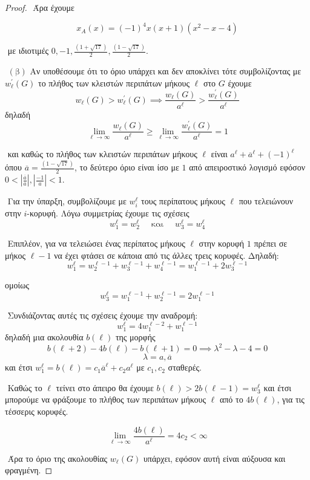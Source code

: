 \documentclass[oneside,a4paper]{article}
\begin{document}
\begin{proof}
	$ $\newline
	Άρα έχουμε
	
	$$x_A (x) = (-1)^4 x(x+1)(x^2-x-4)$$
	
	$ $\newline
	με ιδιοτιμές $0,-1,\frac{(1+\sqrt{17})}2, \frac{(1-\sqrt{17})}2$.

	$ $\newline
	$(\text{β})$ Αν υποθέσουμε ότι το όριο υπάρχει και δεν αποκλίνει τότε συμβολίζοντας με $w^{\prime}_{\ell}(G)$ το πλήθος των κλειστών περιπάτων μήκους $\ell$ στο $G$ έχουμε
	$$w_{\ell}(G) > w^{\prime}_{\ell}(G) \implies \frac{w_{\ell}(G)}{a^{\ell}} > \frac{w^{\prime}_{\ell}(G)}{a^{\ell}}$$
	δηλαδή 
	$$\lim_{\ell \rightarrow \infty} \frac{w_{\ell}(G)}{a^{\ell}} \geq \lim_{\ell \rightarrow \infty} \frac{w^{\prime}_{\ell}(G)}{a^{\ell}} = 1 $$

	$ $\newline
	και καθώς το πλήθος των κλειστών περιπάτων μήκους $\ell$ είναι $a^{\ell} + \overline{a}^{\ell} + (-1)^{\ell}$ όπου $\overline{a} = \frac{(1-\sqrt{17})}2$, το δεύτερο όριο είναι ίσο με $1$ από απειροστικό λογισμό εφόσον $0 < |\frac{\overline{a}}a|,|\frac{-1}a| <1$.

	$ $\newline
	Για την ύπαρξη, συμβολίζουμε με $w^{\ell}_i$ τους περίπατους μήκους $\ell$ που τελειώνουν στην $i$-κορυφή. Λόγω συμμετρίας έχουμε τις σχέσεις
	$$w^{\ell}_1 = w^{\ell}_2 \quad \text{ και } \quad w^{\ell}_3 = w^{\ell}_4$$

	$ $\newline
	Επιπλέον, για να τελειώσει ένας περίπατος μήκους $\ell$ στην κορυφή $1$ πρέπει σε μήκος $\ell-1$ να έχει φτάσει σε κάποια από τις άλλες τρεις κορυφές. Δηλαδή:
	$$w^{\ell}_1 = w^{\ell -1}_2 + w^{\ell -1}_3 + w^{\ell -1}_4 = w^{\ell -1}_1 + 2 w^{\ell-1}_3$$

	ομοίως
	$$w^{\ell}_3 = w^{\ell-1}_1 + w^{\ell-1}_2 = 2 w^{\ell-1}_1$$

	$ $\newline
	Συνδιάζοντας αυτές τις σχέσεις έχουμε την αναδρομή:
	$$w^{\ell}_1 = 4 w^{\ell-2}_1 + w^{\ell - 1}_1$$
	δηλαδή μια ακολουθία $b(\ell)$ της μορφής
	$$b(\ell +2) -4 b(\ell) - b(\ell +1) = 0 \implies \lambda^2 - \lambda - 4 = 0 $$
	$$\lambda = a,\overline{a}$$
	και έτσι $w^{\ell}_1 = b(\ell) = c_1 \overline{a}^{\ell} + c_2 a^{\ell}$ με $c_1,c_2$ σταθερές.

	$ $\newline
	Καθώς το $\ell$ τείνει στο άπειρο θα έχουμε $b(\ell) > 2 b(\ell - 1) = w^{\ell}_3 $ και έτσι μπορούμε να φράξουμε το πλήθος των περιπάτων μήκους $\ell$ από το $4b(\ell)$, για τις τέσσερις κορυφές.

	$$\lim_{\ell \rightarrow \infty} \frac{4b(\ell)}{a^{\ell}} = 4c_2 < \infty $$

	$ $\newline
	Άρα το όριο της ακολουθίας $w_{\ell}(G)$ υπάρχει, εφόσον αυτή είναι αύξουσα και φραγμένη.
\end{proof}
\end{document}
